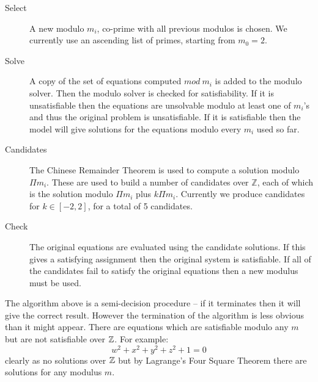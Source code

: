 \begin{description}
\item[Select]{A new modulo $m_i$, co-prime with all previous modulos is chosen.
We currently use an ascending list of primes, starting from $m_0 = 2$.}

\item[Solve]{A copy of the set of equations computed $mod\ m_i$ is added
  to the modulo solver.  Then the modulo solver is checked for
  satisfiability.  If it is unsatisfiable then the equations are unsolvable
  modulo at least one of $m_i$'s and thus the original problem is
  unsatisfiable.  If it is satisfiable then the model will give
  solutions for the equations modulo every $m_i$ used so far.}

\item[Candidates]{The Chinese Remainder Theorem is used to compute
  a solution modulo $\Pi m_i$.  These are used to build a number of
  candidates over $\mathbb{Z}$, each of which is the solution
  modulo $\Pi m_i$ plus $k \Pi m_i$.  Currently we produce candidates
  for  $k \in [-2,2]$, for a total of 5 candidates.}

\item[Check]{The original equations are evaluated using the candidate
  solutions.  If this gives a satisfying assignment then the original
  system is satisfiable.  If all of the candidates fail to satisfy the
  original equations then a new modulus must be used.}
\end{description}



%

The algorithm above is a semi-decision procedure -- if it terminates
then it will give the correct result.
%
However the termination of the algorithm is less obvious than it might
appear.
%
There are equations which are satisfiable modulo any $m$ but are not
satisfiable over $\mathbb{Z}$.
For example:
%
\begin{equation*}
  w^2 + x^2 + y^2 + z^2 + 1 = 0
\end{equation*}
%
\noindent clearly as no solutions over $\mathbb{Z}$ but by Lagrange's Four
Square Theorem there are solutions for any modulus $m$.
